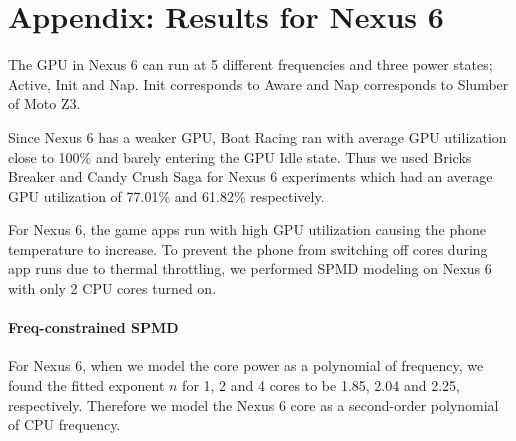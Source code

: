 \section*{Appendix: Results for Nexus 6 }

The GPU in Nexus 6 can run at 5 different frequencies and three power states; Active, Init and Nap. Init corresponds to Aware and Nap corresponds to Slumber of Moto Z3.

Since Nexus 6 has a weaker GPU, Boat Racing ran with average GPU utilization close to 100\%
and barely entering the GPU Idle state.
Thus we used Bricks Breaker and Candy Crush Saga for Nexus 6 experiments 
which had an average GPU utilization of 77.01\% and 61.82\% respectively.

For Nexus 6, the game apps run with high GPU utilization causing the phone temperature to increase. 
To prevent the phone from switching off cores during app runs due to thermal throttling,
we performed SPMD modeling on Nexus 6 with only 2 CPU cores turned on.


\paragraph{Freq-constrained SPMD} 
For Nexus 6, when we model the core power as a polynomial of frequency, 
we found the fitted exponent $n$ for 1, 2 and 4 cores to be {1.85, 2.04 and 2.25, respectively}. 
Therefore we model the Nexus 6 core as a second-order polynomial of CPU frequency.

